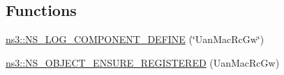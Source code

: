 \subsection*{Functions}
\begin{DoxyCompactItemize}
\item 
\hyperlink{namespacens3_ac6b6b22879bb01d758e9c56632cbcdff}{ns3\+::\+N\+S\+\_\+\+L\+O\+G\+\_\+\+C\+O\+M\+P\+O\+N\+E\+N\+T\+\_\+\+D\+E\+F\+I\+NE} (\char`\"{}Uan\+Mac\+Rc\+Gw\char`\"{})
\item 
\hyperlink{namespacens3_a2bd4a325cb7c0a00a6b882ad658612f6}{ns3\+::\+N\+S\+\_\+\+O\+B\+J\+E\+C\+T\+\_\+\+E\+N\+S\+U\+R\+E\+\_\+\+R\+E\+G\+I\+S\+T\+E\+R\+ED} (Uan\+Mac\+Rc\+Gw)
\end{DoxyCompactItemize}
